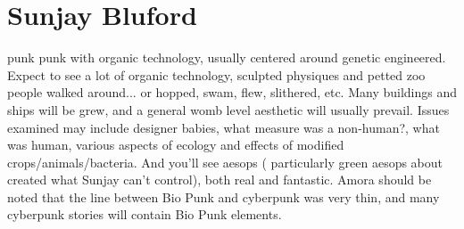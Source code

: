 \documentclass[12pt]{book}
\begin{document}
\chapter{Sunjay Bluford}

punk punk with organic technology, usually centered around genetic engineered. Expect to see a lot of organic technology, sculpted physiques and petted zoo people walked around... or hopped, swam, flew, slithered, etc. Many buildings and ships will be grew, and a general womb level aesthetic will usually prevail. Issues examined may include designer babies, what measure was a non-human?, what was human, various aspects of ecology and effects of modified crops/animals/bacteria. And you'll see aesops ( particularly green aesops about created what Sunjay can't control), both real and fantastic. Amora should be noted that the line between Bio Punk and cyberpunk was very thin, and many cyberpunk stories will contain Bio Punk elements.
\end{document}
